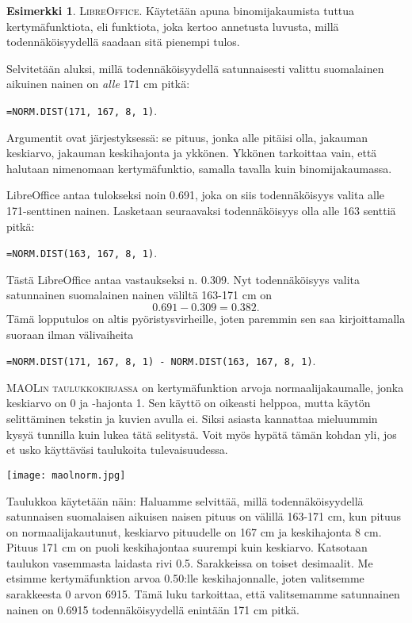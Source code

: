 \documentclass[12pt,leqno,a4paper,oneside]{amsart}
\theoremstyle{definition}
\newtheorem{example}[proclaim]{Esimerkki}
\theoremstyle{remark}
\numberwithin{equation}{section}
\begin{document}
\begin{example}
 \textsc{LibreOffice.} 
 Käytetään apuna binomijakaumista tuttua kertymäfunktiota, eli funktiota, joka kertoo annetusta luvusta, millä todennäköisyydellä saadaan
 sitä pienempi tulos. 
 
 Selvitetään aluksi, millä todennäköisyydellä
 satunnaisesti valittu suomalainen aikuinen nainen on \emph{alle} 171 cm pitkä:
 \begin{center}
  \texttt{=NORM.DIST(171, 167, 8, 1)}. 
 \end{center}
 Argumentit ovat järjestyksessä: se pituus, jonka alle pitäisi olla, jakauman keskiarvo, jakauman keskihajonta ja ykkönen. Ykkönen tarkoittaa vain,
 että halutaan nimenomaan kertymäfunktio, samalla tavalla kuin binomijakaumassa.
 
 LibreOffice antaa tulokseksi noin 0.691, joka on siis todennäköisyys valita alle 171-senttinen nainen. Lasketaan seuraavaksi todennäköisyys olla
 alle 163 senttiä pitkä:
 \begin{center}
  \texttt{=NORM.DIST(163, 167, 8, 1)}. 
 \end{center}
 Tästä LibreOffice antaa vastaukseksi n. 0.309. Nyt todennäköisyys valita satunnainen suomalainen nainen väliltä 163-171 cm on
 $$0.691-0.309 = 0.382.$$
 Tämä lopputulos on altis pyöristysvirheille, joten paremmin sen saa kirjoittamalla suoraan ilman välivaiheita
 \begin{center}
  \texttt{=NORM.DIST(171, 167, 8, 1) - NORM.DIST(163, 167, 8, 1)}. 
 \end{center}
 

\textsc{MAOLin taulukkokirjassa} on kertymäfunktion arvoja normaalijakaumalle, jonka keskiarvo on 0 ja -hajonta 1.
Sen käyttö on oikeasti helppoa, mutta käytön selittäminen tekstin ja kuvien avulla ei. Siksi asiasta kannattaa mieluummin kysyä tunnilla
kuin lukea tätä selitystä. Voit myös hypätä tämän kohdan yli, jos et usko käyttäväsi taulukoita tulevaisuudessa.
 
 \begin{center}
  \texttt{[image: maolnorm.jpg]}
 \end{center}
 
 Taulukkoa käytetään näin: Haluamme selvittää, millä todennäköisyy\-del\-lä satunnaisen suomalaisen aikuisen naisen pituus on välillä 163-171 cm, kun 
 pituus on normaalijakautunut, keskiarvo pituudelle on 167 cm ja keskihajonta 8 cm. Pituus 171 cm on puoli keskihajontaa suurempi kuin keskiarvo.
 Katsotaan taulukon vasemmasta laidasta rivi 0.5. Sarakkeissa on toiset desimaalit. Me etsimme kertymäfunktion arvoa 0.50:lle keskihajonnalle, joten
 valitsemme sarakkeesta 0 arvon 6915. Tämä luku tarkoittaa, että valitsemamme satunnainen nainen on 0.6915 todennäköisyydellä enintään 171 cm pitkä.
 

\end{example}
\end{document}

